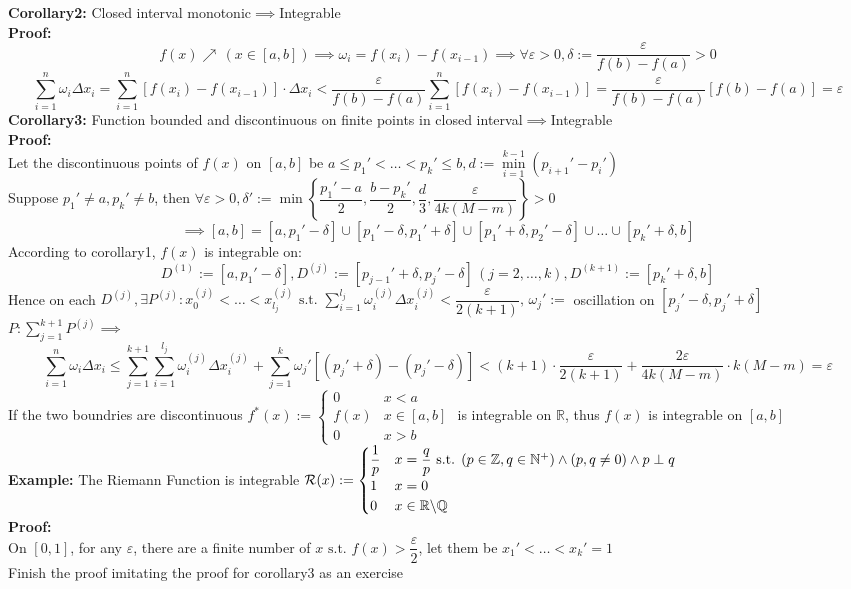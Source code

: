 \documentclass{article}
\newcommand{\R}{\mathbb{R}}
\newcommand{\st}{\mbox{ s.t. }}
\newcommand{\0}{{\bf{0}}}
\begin{document}
\textbf{Corollary2: }Closed interval monotonic$\implies$Integrable\\
\textbf{Proof:}
$$f(x)\nearrow\,(x\in[a,b])\implies\omega_i=f(x_{i})-f(x_{i-1})\implies\forall\varepsilon>0,\delta:=\frac{\varepsilon}{f(b)-f(a)}>0$$
$$\sum_{i=1}^{n}\omega_{i}\Delta x_{i}=\sum_{i=1}^{n}[f(x_{i})-f(x_{i-1})]\cdot\Delta x_{i}<\frac{\varepsilon}{f(b)-f(a)}\sum_{i=1}^{n}[f(x_{i})-f(x_{i-1})]=\frac{\varepsilon}{f(b)-f\left(a\right)}\left[f\left(b\right)-f\left(a\right)\right]=\varepsilon$$
\textbf{Corollary3: }Function bounded and discontinuous on finite points in closed interval$\implies$Integrable\\
\textbf{Proof:}\\
Let the discontinuous points of $f(x)$ on $[a,b]$ be $a\leq p_1'<\dots<p_k'\leq b,d:=\min\limits_{i=1}^{k-1}(p_{i+1}'-p_i')$\\
Suppose $p_1'\neq a,p_k'\neq b$, then $\forall\varepsilon>0,\delta':=\min\left\{\dfrac{p_1'-a}{2},\dfrac{b-p_k'}{2},\dfrac{d}{3},\dfrac{\varepsilon}{4k(M-m)}\right\}>0$
$$\implies[a,b]=[a,p_1'-\delta]\cup[p_1'-\delta,p_1'+\delta]\cup[p_1'+\delta,p_2'-\delta]\cup\dots\cup[p_k'+\delta,b]$$
According to corollary1, $f(x)$ is integrable on:
$$D^{(1)}:=[a,p_1'-\delta],D^{(j)}:=[p_{j-1}'+\delta,p_j'-\delta]\,(j=2,\dots,k),D^{(k+1)}:=[p_k'+\delta,b]$$
Hence on each $D^{(j)},\exists P^{(j)}:x_0^{(j)}<\dots<x_{l_j}^{(j)}\st\sum\limits_{i=1}^{l_j}\omega_i^{(j)}\Delta x_i^{(j)}<\dfrac{\varepsilon}{2(k+1)},\,\omega_j':=$ oscillation on $[p_j'-\delta,p_j'+\delta]$\\
$P:\displaystyle\sum_{j=1}^{k+1}P^{(j)}\implies$
$$\sum_{i=1}^n\omega_i\Delta x_i\le\sum_{j=1}^{k+1}\sum_{i=1}^{l_j}\omega_{i}^{(j)}\Delta x_i^{(j)}+\sum_{j=1}^{k}\omega_j'[(p_j'+\delta)-(p_j'-\delta)]<(k+1)\cdot\frac{\varepsilon}{2(k+1)}+\frac{2\varepsilon}{4k\left(M-m\right)}\cdot k\left(M-m\right)=\varepsilon$$
If the two boundries are discontinuous $f^*(x):=\begin{cases}
    0&x<a\\
    f(x)&x\in[a,b]\\
    0&x>b\
\end{cases}$ is integrable on $\R$, thus $f(x)$ is integrable on $[a,b]$\\
\textbf{Example:} The Riemann Function is integrable $\mathcal{R}(x):=\begin{cases}
    \dfrac{1}{p}&x=\dfrac{q}{p}\st(p\in\mathbb{Z},q\in \mathbb{N}^+)\land(p,q\neq0)\land p\perp q\\
    1&{x=0}\\
    0&x\in\R\symbol{92}\mathbb{Q}\\
\end{cases}$\\
\textbf{Proof:}\\
On $[0,1]$, for any $\varepsilon$, there are a finite number of $x\st f(x)>\dfrac{\varepsilon}{2}$, let them be $x_1'<\dots<x_k'=1$\\
\null\hfill{Finish the proof imitating the proof for corollary3 as an exercise}
\end{document}
